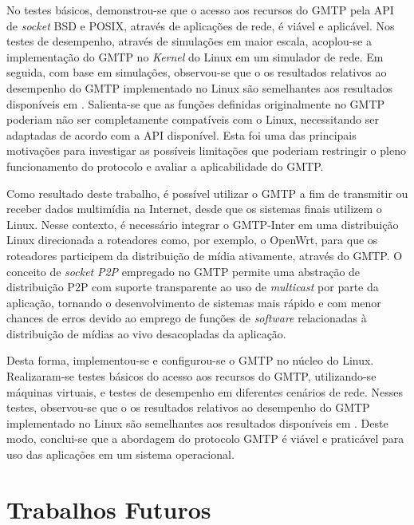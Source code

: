 No testes básicos, demonstrou-se que o acesso aos recursos do GMTP pela API de \textit{socket} BSD e POSIX, através de aplicações de rede, é viável e aplicável.
Nos testes de desempenho, através de simulações em maior escala, acoplou-se a implementação do GMTP no \textit{Kernel} do Linux em um simulador de rede. 
Em seguida, com base em simulações, observou-se que o os resultados relativos ao desempenho do GMTP implementado no Linux são semelhantes aos resultados disponíveis em \cite{sales2014gmtp}.
Salienta-se que as funções definidas originalmente no GMTP poderiam não ser completamente compatíveis com o Linux, necessitando ser adaptadas de acordo com a API disponível. 
Esta foi uma das principais motivações para investigar as possíveis limitações que poderiam restringir o pleno funcionamento do protocolo e avaliar a aplicabilidade do GMTP.

Como resultado deste trabalho, é possível utilizar o GMTP a fim de transmitir ou receber dados multimídia na Internet, desde que os sistemas finais utilizem o Linux.
Nesse contexto, é necessário integrar o GMTP-Inter em uma distribuição Linux direcionada a roteadores como, por exemplo, o OpenWrt, para que os roteadores participem da distribuição de mídia ativamente, através do GMTP.
O conceito de \textit{socket} \textit{P2P} empregado no GMTP permite uma abstração de distribuição P2P com suporte transparente ao uso de \textit{multicast} por parte da aplicação, tornando o desenvolvimento de sistemas mais rápido e com menor chances de erros devido ao emprego de funções de \textit{software} relacionadas à distribuição de mídias ao vivo desacopladas da aplicação.

Desta forma, implementou-se e configurou-se o GMTP no núcleo do Linux. Realizaram-se testes básicos do acesso aos recursos do GMTP, utilizando-se máquinas virtuais, e testes de desempenho em diferentes cenários de rede.
Nesses testes, observou-se que o os resultados relativos ao desempenho do GMTP implementado no Linux são semelhantes aos resultados disponíveis em \cite{sales2014gmtp}.
Deste modo, conclui-se que a abordagem do protocolo GMTP é viável e praticável para uso das aplicações em um sistema operacional.

% 
% 
% 
%

% 
% 
% 
%
\section{Trabalhos Futuros}
\label{sec:lim_fut}
\label{sec:futuros}

